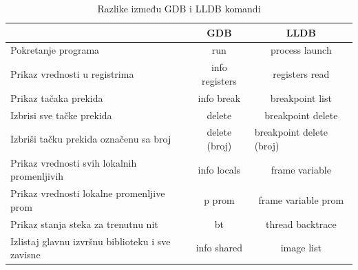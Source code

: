 \documentclass[a4paper]{article}
\begin{document}
\begin{table}[h!]
\begin{center}
\caption{Razlike između GDB i LLDB komandi}
\begin{tabular}{|l|c|c|} \hline
                                                 & GDB            & LLDB                                                                  \\ \hline
\rowcolor[HTML]{C0C0C0} 
Pokretanje programa                              & run            & process launch                                                        \\
Prikaz vrednosti u registrima                    & info registers & registers read                                                        \\
\rowcolor[HTML]{C0C0C0} 
Prikaz tačaka prekida                            & info break     & breakpoint list                                                       \\
Izbrisi sve tačke prekida                        & delete         & breakpoint delete                                                     \\
\rowcolor[HTML]{C0C0C0} 
Izbriši tačku prekida označenu sa broj           & delete (broj)  & \multicolumn{1}{l|}{\cellcolor[HTML]{C0C0C0}breakpoint delete (broj)} \\
Prikaz vrednosti svih lokalnih promenljivih      & info locals    & frame variable                                                        \\
\rowcolor[HTML]{C0C0C0} 
Prikaz vrednosti lokalne promenljive prom        & p prom         & frame variable prom                                                   \\
Prikaz stanja steka za trenutnu nit              & bt             & thread backtrace                                                      \\
\rowcolor[HTML]{C0C0C0} 
Izlistaj glavnu izvršnu biblioteku i sve zavisne & info shared    & image list                                                            \\ \hline
\end{tabular}
\label{tab:tabela1}
\end{center}
\end{table}
\end{document}
